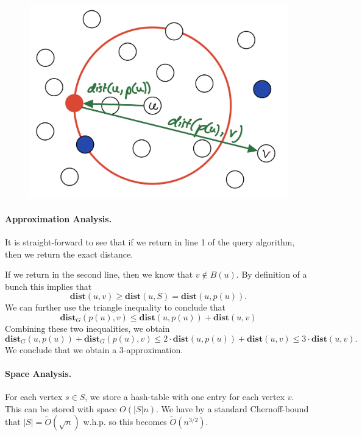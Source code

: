 \begin{figure}[!ht]
    \centering
    \includegraphics[scale=0.25]{./fig/lecture_DistanceOracles_Query.jpeg}
\end{figure}

\paragraph{Approximation Analysis.} It is straight-forward to see that if we return in line 1 of the query algorithm, then we return the exact distance.

If we return in the second line, then we know that $v \not\in B(u)$. By definition of a bunch this implies that 
\[
 \mathbf{dist}(u,v) \geq \mathbf{dist}(u,S) = \mathbf{dist}(u,p(u)).
\]
We can further use the triangle inequality to conclude that
\[
\mathbf{dist}_G(p(u),v) \leq \mathbf{dist}(u,p(u)) + \mathbf{dist}(u,v)
\]
Combining these two inequalities, we obtain
\[
\mathbf{dist}_G(u,p(u)) + \mathbf{dist}_G(p(u),v) \leq 2 \cdot \mathbf{dist}(u,p(u)) + \mathbf{dist}(u,v) \leq 3 \cdot \mathbf{dist}(u,v).
\]
We conclude that we obtain a $3$-approximation.

\paragraph{Space Analysis.} For each vertex $s \in S$, we store a hash-table with one entry for each vertex $v$. This can be stored with space $O(|S|n)$. We have by a standard Chernoff-bound that $|S| = \tilde{O}(\sqrt{n})$ w.h.p. so this becomes $\tilde{O}(n^{3/2})$.

